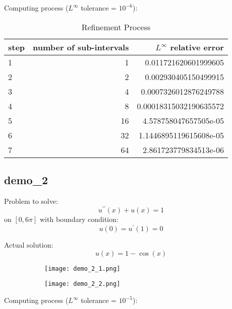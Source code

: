 \documentclass{article}
\begin{document}
Computing process ($L^\infty$ tolerance = $10^{-6}$):

\begin{table}[H]
    \centering
    \begin{tabular}{l|r|r}
        step & number of sub-intervals & $L^\infty$ relative error \\
        \hline
        1  &  1 & 0.011721620601999605 \\
        2  &  2 & 0.002930405150499915 \\
        3  &  4 & 0.0007326012876249788 \\
        4  &  8 & 0.00018315032190635572 \\
        5  & 16 & 4.578758047657505e-05 \\
        6  & 32 & 1.1446895119615608e-05 \\
        7  & 64 & 2.861723779834513e-06 \\
    \end{tabular}
    \caption{Refinement Process}
\end{table}


\subsection{demo\_2}

Problem to solve:
$$
    u^{\prime\prime}(x) + u(x) = 1
$$ on $[0, 6\pi]$
with boundary condition:
$$
    u(0) = u^\prime(1) = 0
$$

Actual solution:
$$
    u(x) = 1 - \cos(x)
$$

\begin{figure}[H]
	\centering
	\begin{subfigure}[h]{0.45\linewidth}
	    \texttt{[image: demo\_2\_1.png]}
    \end{subfigure}
    \begin{subfigure}[h]{0.45\linewidth}
	    \texttt{[image: demo\_2\_2.png]}
    \end{subfigure}
\end{figure}

Computing process ($L^\infty$ tolerance = $10^{-5}$):
\end{document}
